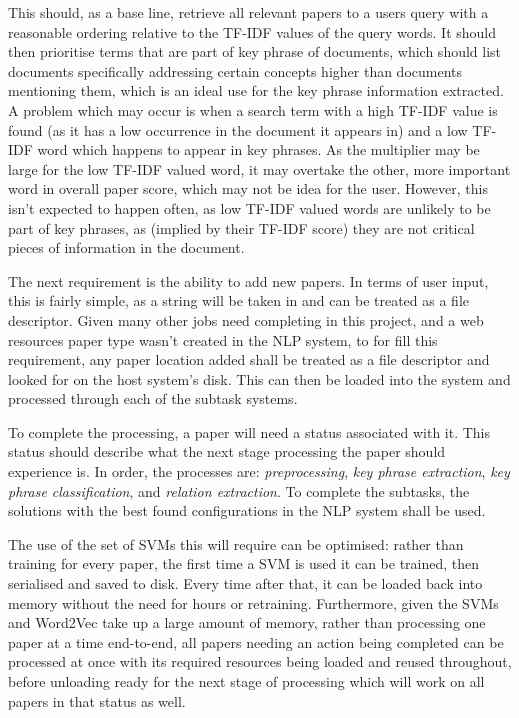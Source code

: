 This should, as a base line, retrieve all relevant papers to a users query with a reasonable ordering relative to the TF-IDF values of the query words. It should then prioritise terms that are part of key phrase of documents, which should list documents specifically addressing certain concepts higher than documents mentioning them, which is an ideal use for the key phrase information extracted. A problem which may occur is when a search term with a high TF-IDF value is found (as it has a low occurrence in the document it appears in) and a low TF-IDF word which happens to appear in key phrases. As the multiplier may be large for the low TF-IDF valued word, it may overtake the other, more important word in overall paper score, which may not be idea for the user. However, this isn't expected to happen often, as low TF-IDF valued words are unlikely to be part of key phrases, as (implied by their TF-IDF score) they are not critical pieces of information in the document. 

The next requirement is the ability to add new papers. In terms of user input, this is fairly simple, as a string will be taken in and can be treated as a file descriptor. Given many other jobs need completing in this project, and a web resources paper type wasn't created in the NLP system, to for fill this requirement, any paper location added shall be treated as a file descriptor and looked for on the host system's disk. This can then be loaded into the system and processed through each of the subtask systems.

To complete the processing, a paper will need a status associated with it. This status should describe what the next stage processing the paper should experience is. In order, the processes are: \textit{preprocessing}, \textit{key phrase extraction}, \textit{key phrase classification}, and \textit{relation extraction}. To complete the subtasks, the solutions with the best found configurations in the NLP system shall be used.

The use of the set of SVMs this will require can be optimised: rather than training for every paper, the first time a SVM is used it can be trained, then serialised and saved to disk. Every time after that, it can be loaded back into memory without the need for hours or retraining. Furthermore, given the SVMs and Word2Vec take up a large amount of memory, rather than processing one paper at a time end-to-end, all papers needing an action being completed can be processed at once with its required resources being loaded and reused throughout, before unloading ready for the next stage of processing which will work on all papers in that status as well.

